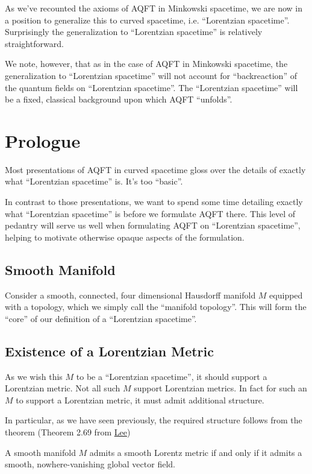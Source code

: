 As we've recounted the axioms of AQFT in Minkowski spacetime, we are now in a position to generalize this to curved spacetime, i.e. ``Lorentzian spacetime''. Surprisingly the generalization to ``Lorentzian spacetime'' is relatively straightforward.

We note, however, that as in the case of AQFT in Minkowski spacetime, the generalization to ``Lorentzian spacetime'' will not account for ``backreaction'' of the quantum fields on ``Lorentzian spacetime''. The ``Lorentzian spacetime'' will be a fixed, classical background upon which AQFT ``unfolds''.

\section{Prologue}\label{sctn:prologue}
Most presentations of AQFT in curved spacetime gloss over the details of exactly what ``Lorentzian spacetime'' is. It's too ``basic''.

In contrast to those presentations, we want to spend some time detailing exactly what ``Lorentzian spacetime'' is before we formulate AQFT there. This level of pedantry will serve us well when formulating AQFT on ``Lorentzian spacetime'', helping to motivate otherwise opaque aspects of the formulation.

\subsection{Smooth Manifold}
Consider a smooth, connected, four dimensional Hausdorff manifold $M$ equipped with a topology, which we simply call the ``manifold topology''. This will form the ``core'' of our definition of a ``Lorentzian spacetime''.

\subsection{Existence of a Lorentzian Metric}
As we wish this $M$ to be a ``Lorentzian spacetime'', it should support a Lorentzian metric. Not all such $M$ support Lorentzian metrics. In fact for such an $M$ to support a Lorentzian metric, it must admit additional structure.

In particular, as we have seen previously, the required structure follows from the theorem (Theorem 2.69 from \href{https://doi.org/10.1007/978-3-319-91755-9}{Lee})

\begin{theorem}
    A smooth manifold $M$ admits a smooth Lorentz metric if and only if it admits a smooth, nowhere-vanishing global vector field.
\end{theorem}

